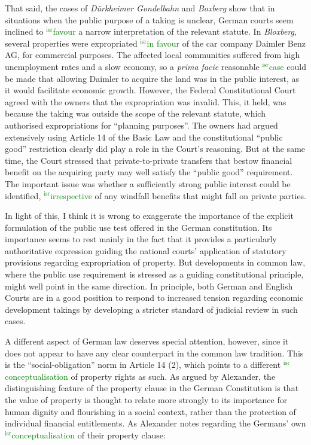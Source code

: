 \documentclass[12pt,a4paper]{book} %
\newcommand{\isr}[1]{\textcolor{green}{$^{\textrm{isr}}${#1}}}
\begin{document}
That said, the cases of {\it D{\"u}rkheimer Gondelbahn} and {\it Boxberg} show that in situations when the public purpose of a taking is unclear, German courts seem inclined to \isr{favour} a narrow interpretation of the relevant statute. In {\it Bloxberg}, several properties were expropriated \isr{in favour} of the car company Daimler Benz AG, for commercial purposes. The affected local communities suffered from high unemployment rates and a slow economy, so a {\it prima facie} reasonable \isr{case} could be made that allowing Daimler to acquire the land was in the public interest, as it would facilitate economic growth. However, the Federal Constitutional Court agreed with the owners that the expropriation was invalid. This, it held, was because the taking was outside the scope of the relevant statute, which authorised expropriations for ``planning purposes''. The owners had argued extensively using Article 14 of the Basic Law and the constitutional ``public good'' restriction clearly did play a role in the Court's reasoning. But at the same time, the Court stressed that private-to-private transfers that bestow financial benefit on the acquiring party may well satisfy the ``public good'' requirement. The important issue was whether a sufficiently strong public interest could be identified, \isr{irrespective} of any windfall benefits that might fall on private parties.

In light of this, I think it is wrong to exaggerate the importance of the explicit formulation of the public use test offered in the German constitution. Its importance seems to rest mainly in the fact that it provides a particularly authoritative expression guiding the national courts' application of statutory provisions regarding expropriation of property. But developments in common law, where the public use requirement is stressed as a guiding constitutional principle, might well point in the same direction. In principle, both German and English Courts are in a good position to respond to increased tension regarding economic development takings by developing a stricter standard of judicial review in such cases.

A different aspect of German law deserves special attention, however, since it does not appear to have any clear counterpart in the common law tradition. This is the  ``social-obligation'' norm in Article 14 (2), which points to a different \isr{conceptualisation} of property rights as such. As argued by Alexander, the distinguishing feature of the property clause in the German Constitution is that the value of property is thought to relate more strongly to its importance for human dignity and flourishing in a social context, rather than the protection of individual financial entitlements. As Alexander notes regarding the Germans' own \isr{conceptualisation} of their property clause:
\end{document}
